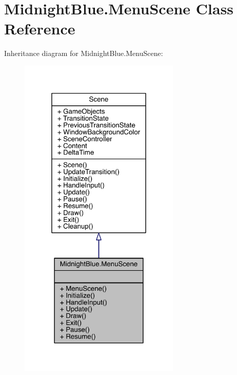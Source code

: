 \hypertarget{class_midnight_blue_1_1_menu_scene}{}\section{Midnight\+Blue.\+Menu\+Scene Class Reference}
\label{class_midnight_blue_1_1_menu_scene}


Inheritance diagram for Midnight\+Blue.\+Menu\+Scene\+:
\nopagebreak
\begin{figure}[H]
\begin{center}
\leavevmode
\includegraphics[width=217pt]{class_midnight_blue_1_1_menu_scene__inherit__graph}
\end{center}
\end{figure}


